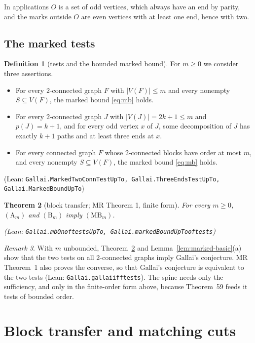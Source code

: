 \documentclass[11pt]{amsart}
\newtheorem{theorem}{Theorem}[section]
\theoremstyle{definition}
\newtheorem{definition}[theorem]{Definition}
\theoremstyle{remark}
\newtheorem{remark}[theorem]{Remark}
\renewcommand{\_}{\oldunderscore\allowbreak}
\newcommand{\leanst}[1]{\par{\raggedright\small\textup{(Lean: \texttt{#1})}\par}}
\newcommand{\MBU}{\mathrm{MB}}
\newcommand{\TA}{\mathrm{A}}
\newcommand{\TB}{\mathrm{B}}
\begin{document}
In applications $O$ is a set of odd vertices, which always have an end by parity, and the marks outside $O$ are even vertices with at least one end, hence with two.

\subsection{The marked tests}

\begin{definition}[tests and the bounded marked bound]\label{def:MB}
For $m\ge0$ we consider three assertions.
\begin{itemize}[leftmargin=4em]
\item[$(\TA_m)$] For every $2$-connected graph $F$ with $|V(F)|\le m$ and every nonempty
$S\subseteq V(F)$, the marked bound \eqref{eq:mb} holds.
\item[$(\TB_m)$] For every $2$-connected graph $J$ with $|V(J)|=2k+1\le m$ and $p(J)=k+1$, and for
every odd vertex $x$ of $J$, some decomposition of $J$ has exactly $k+1$ paths and at least three ends
at $x$.
\item[$(\MBU_m)$] For every connected graph $F$ whose $2$-connected blocks have order at most $m$,
and every nonempty $S\subseteq V(F)$, the marked bound \eqref{eq:mb} holds.
\end{itemize}
\leanst{Gallai.MarkedTwoConnTestUpTo, Gallai.ThreeEndsTestUpTo, Gallai.MarkedBoundUpTo}
\end{definition}

\begin{theorem}[block transfer; MR Theorem 1, finite form]\label{thm:transfer}
For every $m\ge0$, $(\TA_m)$ and $(\TB_m)$ imply $(\MBU_m)$.
\leanst{Gallai.mbOn\_of\_testsUpTo, Gallai.markedBoundUpTo\_of\_tests}
\end{theorem}

\begin{remark}
With $m$ unbounded, Theorem~\ref{thm:transfer} and Lemma~\ref{lem:marked-basic}(a) show that the
two tests on all $2$-connected graphs imply Gallai's conjecture. MR Theorem~1 also proves the
converse, so that Gallai's conjecture is equivalent to the two tests (Lean:
\texttt{Gallai.gallai\_iff\_tests}). The spine needs only the sufficiency, and only in the
finite-order form above, because Theorem~59 feeds it tests of bounded order.
\end{remark}

\section{Block transfer and matching cuts}\label{sec:transfer}
\end{document}
